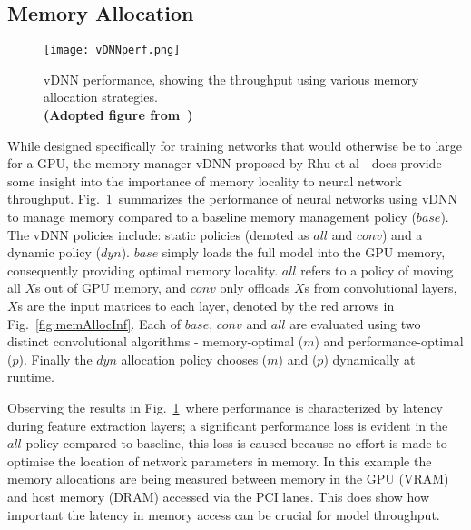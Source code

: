 \documentclass[../../D1.tex]{subfiles}
\begin{document}


\subsection{Memory Allocation}\label{sec:MemAlloc}
\begin{figure}[H]
    \texttt{[image: vDNNperf.png]} 
    \caption{vDNN performance, showing the throughput using various memory allocation strategies. \\ \textbf{(Adopted figure from~\autocite{rhuVDNNVirtualizedDeep2016})}}
    \label{fig:vDNNperf}   
\end{figure}

While designed specifically for training networks that would otherwise be to large for a GPU, the memory manager vDNN proposed by Rhu et al~\autocite{rhuVDNNVirtualizedDeep2016}~does provide some insight into the importance of memory locality to neural network throughput.
Fig.~\ref{fig:vDNNperf}~summarizes the performance of neural networks using vDNN to manage memory compared to a baseline memory management policy ($base$). The vDNN policies include: static policies (denoted as $all$ and $conv$) and a dynamic policy ($dyn$).
$base$ simply loads the full model into the GPU memory, consequently providing optimal memory locality. $all$ refers to a policy of moving all $X$s out of GPU memory, and $conv$ only offloads $X$s from convolutional layers, $X$s are the input matrices to each layer, denoted by the red arrows in Fig.~\ref{fig:memAllocInf}.
Each of $base$, $conv$ and $all$ are evaluated using two distinct convolutional algorithms - memory-optimal ($m$) and performance-optimal ($p$).
Finally the $dyn$ allocation policy chooses ($m$) and ($p$) dynamically at runtime.

Observing the results in Fig.~\ref{fig:vDNNperf}~where performance is characterized by latency during feature extraction layers; a significant performance loss is evident in the $all$ policy compared to baseline, this loss is caused because no effort is made to optimise the location of network parameters in memory.
In this example the memory allocations are being measured between memory in the GPU (VRAM) and host memory (DRAM) accessed via the PCI lanes. This does show how important the latency in memory access can be crucial for model throughput.
\end{document}
